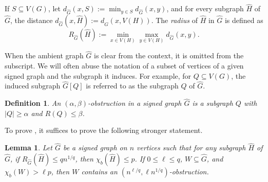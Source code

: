 \documentclass{article}
\newtheorem{definition}[theorem]{Definition}
\newtheorem{lemma}[theorem]{Lemma}
\begin{document}
If $S\subseteq V(G)$,
let $d_{\widehat{G}}(x,S):=\min_{y\in S}d_{\widehat{G}}(x,y)$, and for every subgraph $\widehat{H}$ of $\widehat{G}$, the distance $d_{\widehat{G}}(x,\widehat{H}):=d_{\widehat{G}}(x,V(H))$.
The \emph{radius} of $\widehat{H}$ in $\widehat{G}$ is defined as 
$$R_{\widehat{G}}(\widehat{H}):=\min_{x\in V(H)}\max_{y\in V(H)}d_{\widehat{G}}(x,y).$$

When the ambient graph $\widehat{G}$ is clear from the context, it is omitted from the subscript. We will often abuse the notation of a subset of vertices of a given signed graph and the subgraph it induces. For example, for $Q\subseteq V(G)$, the induced subgraph $\widehat{G}[Q]$ is referred to as the subgraph $Q$ of $\widehat{G}$.


\begin{definition}
    An $(\alpha,\beta)$-obstruction in a signed graph $\widehat{G}$ is a subgraph $Q$ with $|Q|\geq \alpha$ and $R(Q)\leq \beta$.
\end{definition}


To prove , it suffices to prove the following stronger statement.

\begin{lemma}\label{lem:signedKST}
    Let $\widehat{G}$ be a signed graph on $n$ vertices such that for any subgraph $\widehat{H}$ of $\widehat{G}$, if $R_{\widehat{G}}(\widehat{H})\leq qn^{1/q}$, then $\chi_b(\widehat{H})\leq p$. If $0\leq \ell\leq q$, $W\subseteq \widehat{G}$, and $\chi_b(W)>\ell p$, then $W$ contains an $(n^{\ell/q},\ell n^{1/q})$-obstruction.
\end{lemma}
\end{document}
